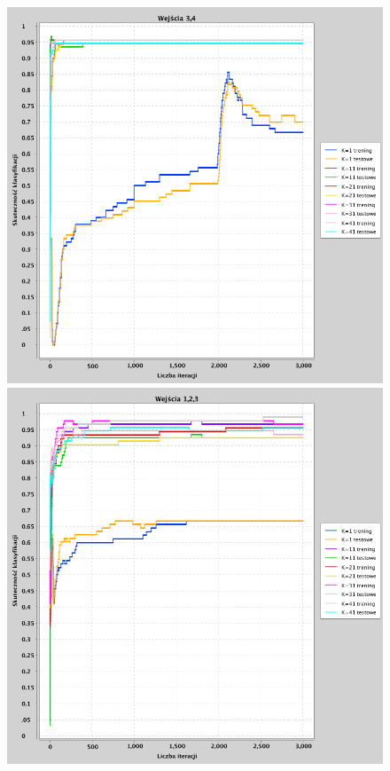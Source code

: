 \documentclass[a4paper, portrait,11pt]{article}
\begin{document}
\begin{figure}[!htb]
  \begin{minipage}{0.33\textwidth}
    \centering
    \includegraphics[width=1\linewidth]{../data/classification4/1/derivatives/2_3,4.png}
    \caption{\label{fig:41_2_3,4derivative}}
  \end{minipage}
  \begin{minipage}{0.33\textwidth}
    \centering
    \includegraphics[width=1\linewidth]{../data/classification4/1/derivatives/3_1,2,3.png}

\end{minipage}
\end{figure}
\end{document}
